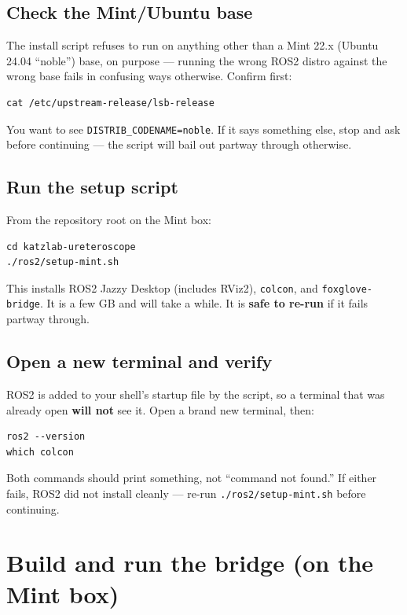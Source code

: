 \documentclass[11pt]{article}
\begin{document}
\subsection{Check the Mint/Ubuntu base}
The install script refuses to run on anything other than a Mint 22.x
(Ubuntu 24.04 ``noble'') base, on purpose --- running the wrong ROS2
distro against the wrong base fails in confusing ways otherwise. Confirm
first:

\begin{lstlisting}
cat /etc/upstream-release/lsb-release
\end{lstlisting}

You want to see \texttt{DISTRIB\_CODENAME=noble}. If it says something
else, stop and ask before continuing --- the script will bail out partway
through otherwise.

\subsection{Run the setup script}
From the repository root on the Mint box:

\begin{lstlisting}
cd katzlab-ureteroscope
./ros2/setup-mint.sh
\end{lstlisting}

This installs ROS2 Jazzy Desktop (includes RViz2), \texttt{colcon}, and
\texttt{foxglove-bridge}. It is a few GB and will take a while. It is
\textbf{safe to re-run} if it fails partway through.

\subsection{Open a new terminal and verify}
ROS2 is added to your shell's startup file by the script, so a terminal
that was already open \textbf{will not} see it. Open a brand new terminal,
then:

\begin{lstlisting}
ros2 --version
which colcon
\end{lstlisting}

Both commands should print something, not ``command not found.'' If
either fails, ROS2 did not install cleanly --- re-run
\texttt{./ros2/setup-mint.sh} before continuing.

\section{Build and run the bridge (on the Mint box)}
\end{document}
